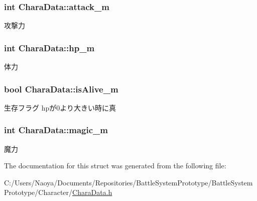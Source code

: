 \subsubsection[{attack\+\_\+m}]{\setlength{\rightskip}{0pt plus 5cm}int Chara\+Data\+::attack\+\_\+m}\label{struct_chara_data_a329e47c82a4348e2245713aeb51eced5}
攻撃力 \hypertarget{struct_chara_data_a7186ee61c28b6a84b0c7a41524ee7d01}{}
\subsubsection[{hp\+\_\+m}]{\setlength{\rightskip}{0pt plus 5cm}int Chara\+Data\+::hp\+\_\+m}\label{struct_chara_data_a7186ee61c28b6a84b0c7a41524ee7d01}
体力 \hypertarget{struct_chara_data_a87b4617204eaa6cb9a683389afb0647e}{}
\subsubsection[{is\+Alive\+\_\+m}]{\setlength{\rightskip}{0pt plus 5cm}bool Chara\+Data\+::is\+Alive\+\_\+m}\label{struct_chara_data_a87b4617204eaa6cb9a683389afb0647e}
生存フラグ hpが0より大きい時に真 \hypertarget{struct_chara_data_ad76e5c9e2a90755979af927101ec43ac}{}
\subsubsection[{magic\+\_\+m}]{\setlength{\rightskip}{0pt plus 5cm}int Chara\+Data\+::magic\+\_\+m}\label{struct_chara_data_ad76e5c9e2a90755979af927101ec43ac}
魔力 

The documentation for this struct was generated from the following file\+:\begin{DoxyCompactItemize}
\item 
C\+:/\+Users/\+Naoya/\+Documents/\+Repositories/\+Battle\+System\+Prototype/\+Battle\+System\+Prototype/\+Character/\hyperlink{_chara_data_8h}{Chara\+Data.\+h}\end{DoxyCompactItemize}
